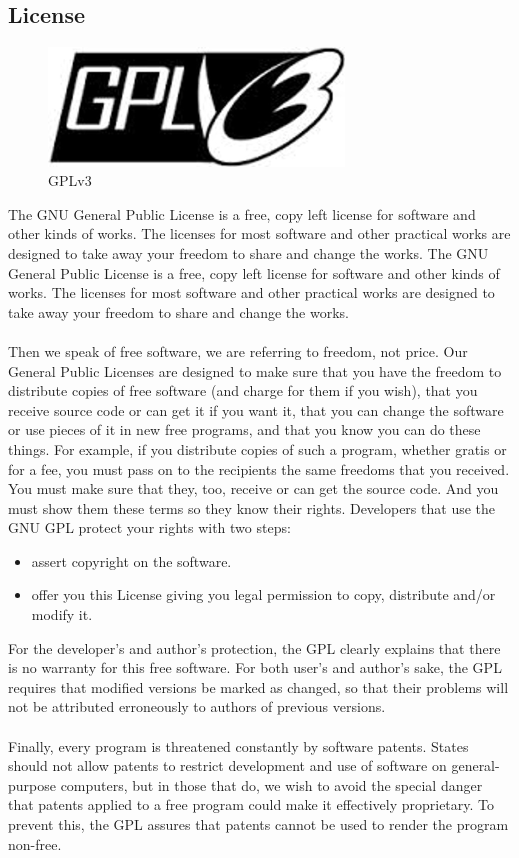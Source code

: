 \subsection{License}
\begin{figure}[h!]
\centering
\includegraphics[width=0.7\textwidth]{images/gpl.jpg}
\caption{GPLv3}
\end{figure}
The GNU General Public License is a free, copy left license for software and other kinds
of works. The licenses for most software and other practical works are designed to take
away your freedom to share and change the works. The GNU General Public License is a free, copy left license for software and other kinds of works. The licenses for most software and other practical works are designed to take
away your freedom to share and change the works.\\\\
Then we speak of free software, we are referring to freedom, not price. Our General
Public Licenses are designed to make sure that you have the freedom to distribute copies
of free software (and charge for them if you wish), that you receive source code or can get
it if you want it, that you can change the software or use pieces of it in new free programs,
and that you know you can do these things. For example, if you distribute copies of such a program, whether gratis or for a fee,
you must pass on to the recipients the same freedoms that you received. You must make
sure that they, too, receive or can get the source code. And you must show them these
terms so they know their rights. Developers that use the GNU GPL protect your rights
with two steps:
\begin{itemize}
\item assert copyright on the software.
\item offer you this License giving you legal permission to copy, distribute and/or modify
it.
\end{itemize}
For the developer’s and author’s protection, the GPL clearly explains that there is no
warranty for this free software. For both user’s and author’s sake, the GPL requires that
modiﬁed versions be marked as changed, so that their problems will not be attributed
erroneously to authors of previous versions.\\\\
Finally, every program is threatened constantly by software patents. States should not
allow patents to restrict development and use of software on general-purpose computers,
but in those that do, we wish to avoid the special danger that patents applied to a free
program could make it eﬀectively proprietary. To prevent this, the GPL assures that
patents cannot be used to render the program non-free.\\\\




 

